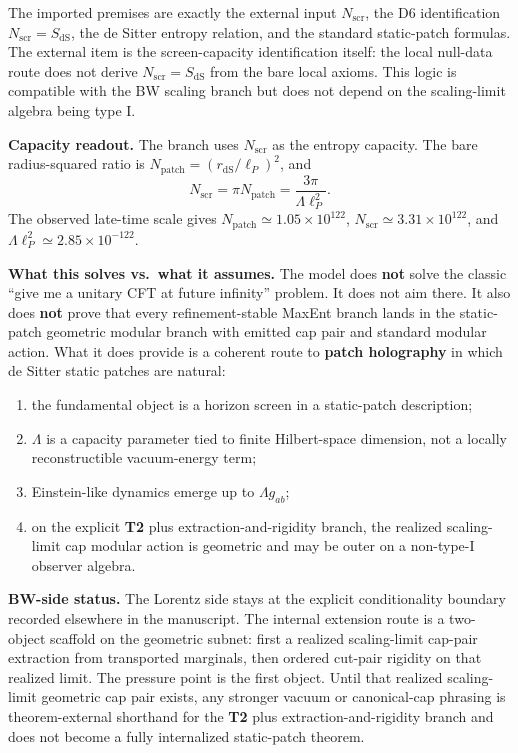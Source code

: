 The imported premises are exactly the external input \(N_{\mathrm{scr}}\), the D6 identification
\(N_{\mathrm{scr}}=S_{\mathrm{dS}}\), the de Sitter entropy relation, and the standard static-patch
formulas. The external item is the screen-capacity identification itself: the local null-data
route does not derive \(N_{\mathrm{scr}}=S_{\mathrm{dS}}\) from the bare local axioms. This
logic is compatible with the BW scaling branch but does not depend on the scaling-limit algebra
being type I.

\textbf{Capacity readout.} The branch uses \(N_{\mathrm{scr}}\) as the entropy capacity. The
bare radius-squared ratio is \(N_{\mathrm{patch}}=(r_{\mathrm{dS}}/\ell_P)^2\), and
\[
N_{\mathrm{scr}}=\pi N_{\mathrm{patch}}
=\frac{3\pi}{\Lambda\ell_P^2}.
\]
The observed late-time scale gives \(N_{\mathrm{patch}}\simeq1.05\times10^{122}\),
\(N_{\mathrm{scr}}\simeq3.31\times10^{122}\), and
\(\Lambda\ell_P^2\simeq2.85\times10^{-122}\).

\textbf{What this solves vs.\ what it assumes.} The model does \textbf{not} solve the classic ``give me a unitary CFT at future infinity'' problem. It does not aim there. It also does \textbf{not} prove that every refinement-stable MaxEnt branch lands in the static-patch geometric modular branch with emitted cap pair and standard modular action. What it does provide is a coherent route to \textbf{patch holography} in which de Sitter static patches are natural:
\begin{enumerate}
\def\labelenumi{\arabic{enumi}.}
\item
the fundamental object is a horizon screen in a static-patch description;
\item
\(\Lambda\) is a capacity parameter tied to finite Hilbert-space dimension, not a locally reconstructible vacuum-energy term;
\item
Einstein-like dynamics emerge up to \(\Lambda g_{ab}\);
\item
on the explicit \textbf{T2} plus extraction-and-rigidity branch, the realized scaling-limit cap modular action is geometric and may be outer on a non-type-I observer algebra.
\end{enumerate}

\textbf{BW-side status.} The Lorentz side stays at the explicit conditionality boundary recorded elsewhere in the manuscript. The internal extension route is a two-object scaffold on the geometric subnet: first a realized scaling-limit cap-pair extraction from transported marginals, then ordered cut-pair rigidity on that realized limit. The pressure point is the first object. Until that realized scaling-limit geometric cap pair exists, any stronger vacuum or canonical-cap phrasing is theorem-external shorthand for the \textbf{T2} plus extraction-and-rigidity branch and does not become a fully internalized static-patch theorem.

